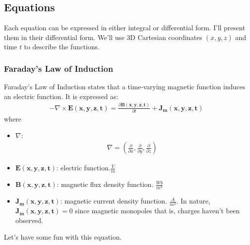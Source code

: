 \subsection{Equations}

Each equation can be expressed in either integral or differential form.
I'll present them in their differential form. We'll use 3D Cartesian
coordinates \((x,y,z)\) and time \(t\) to describe the functions.

\subsubsection{Faraday's Law of Induction}
Faraday's Law of Induction states that a time-varying magnetic function
induces an electric function. It is expressed as:
\begin{align*}
  -\nabla \times \mathbf{E(x,y,z,t)} = \frac{\partial \mathbf{B(x,y,z,t)}}{\partial t} + \mathbf{J_m(x,y,z,t)} \tag{1}
\end{align*}
where
\begin{itemize}
  \item \( \nabla \):
    \begin{align*}
      \nabla = \left( \frac{\partial}{\partial x}, \frac{\partial}{\partial y}, \frac{\partial}{\partial z} \right)
    \end{align*}
  \item \( \mathbf{E(x,y,z,t)} \): electric function.\( \frac{V}{m} \)
  \item \( \mathbf{B(x,y,z,t)} \): magnetic flux density function.
    \( \frac{Wb}{m^2} \)
  \item \( \mathbf{J_m(x,y,z,t)} \): magnetic current density function.
    \( \frac{A}{m^2} \). In nature, \( \mathbf{J_m(x,y,z,t)} = 0 \) since
    magnetic monopoles that is, charges haven't been observed.
\end{itemize}
Let's have some fun with this equation.
